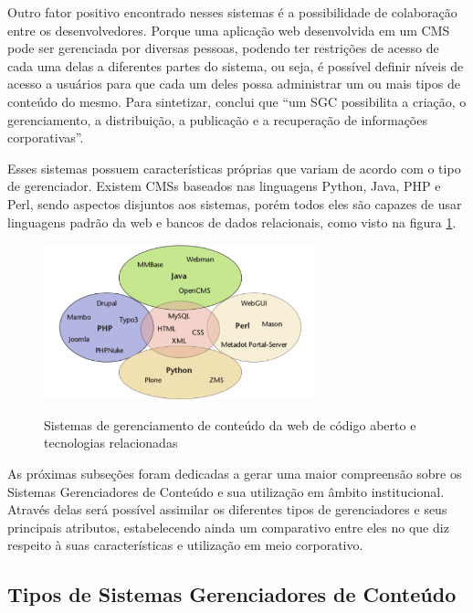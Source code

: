 Outro fator positivo encontrado nesses sistemas é a possibilidade de colaboração entre os desenvolvedores. Porque uma aplicação web desenvolvida em um CMS pode ser gerenciada por diversas pessoas, podendo ter restrições de acesso de cada uma delas a diferentes partes do sistema, ou seja, é possível definir níveis de acesso a usuários para que cada um deles possa administrar um ou mais tipos de conteúdo do mesmo. Para sintetizar,  conclui que ``um SGC possibilita a criação, o gerenciamento, a distribuição, a publicação e a recuperação de informações corporativas''.

Esses sistemas possuem características próprias que variam de acordo com o tipo de gerenciador. Existem CMSs baseados nas linguagens Python, Java, PHP e Perl, sendo aspectos disjuntos aos sistemas, porém todos eles são capazes de usar linguagens padrão da web e bancos de dados relacionais, como visto na figura \ref{figura3}.

\begin{figure}[htb]
 \centering
 \caption{Sistemas de gerenciamento de conteúdo da web de código aberto e tecnologias relacionadas}
 \includegraphics[width=0.7\textwidth]{figuras/linguagens-cms-1}
 \label{figura3}
\end{figure}

As próximas subseções foram dedicadas a gerar uma maior compreensão sobre os Sistemas Gerenciadores de Conteúdo e sua utilização em âmbito institucional. Através delas será possível assimilar os diferentes tipos de gerenciadores e seus principais atributos, estabelecendo ainda um comparativo entre eles no que diz respeito à suas características e utilização em meio corporativo.

\hspace{2.5cm}

\subsection{Tipos de Sistemas Gerenciadores de Conteúdo}

